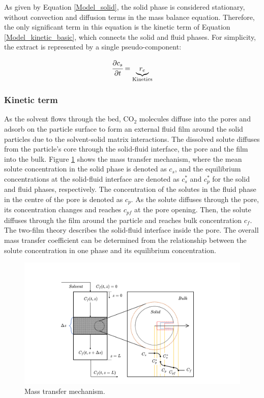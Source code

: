 \documentclass[../Article_Model_Parameters.tex]{subfiles}
\begin{document}
	As given by Equation \ref{Model_solid}, the solid phase is considered stationary, without convection and diffusion terms in the mass balance equation. Therefore, the only significant term in this equation is the kinetic term of Equation \ref{Model_kinetic_basic}, which connects the solid and fluid phases. For simplicity, the extract is represented by a single pseudo-component: 
	
	{\footnotesize
		\begin{equation} 
			\label{Model_solid}
					\cfrac{\partial c_s}{\partial t} = \underbrace{ r_e }_{\text{Kinetics}}
			\end{equation} }
			
			\subsubsection{Kinetic term} \label{CH: Kinetic}
			
			As the solvent flows through the bed, CO$_2$ molecules diffuse into the pores and adsorb on the particle surface to form an external fluid film around the solid particles due to the solvent-solid matrix interactions. The dissolved solute diffuses from the particle's core through the solid-fluid interface, the pore and the film into the bulk. Figure \ref{fig: SFE_Mechanism} shows the mass transfer mechanism, where the mean solute concentration in the solid phase is denoted as $c_s$, and the equilibrium concentrations at the solid-fluid interface are denoted as $c_s^*$ and $c_p^*$ for the solid and fluid phases, respectively. The concentration of the solutes in the fluid phase in the centre of the pore is denoted as $c_p$. As the solute diffuses through the pore, its concentration changes and reaches $c_{pf}$ at the pore opening. Then, the solute diffuses through the film around the particle and reaches bulk concentration $c_f$. The two-film theory describes the solid-fluid interface inside the pore. The overall mass transfer coefficient can be determined from the relationship between the solute concentration in one phase and its equilibrium concentration.
			
			\begin{figure}[h!]
				\centering
				\includegraphics[trim = 45cm 0cm 60cm 20cm,clip,width=0.85\columnwidth]{Figures/SFE_PFD.drawio.png}	
				\caption{Mass transfer mechanism.}
				\label{fig: SFE_Mechanism}
			\end{figure}
			
\end{document}
